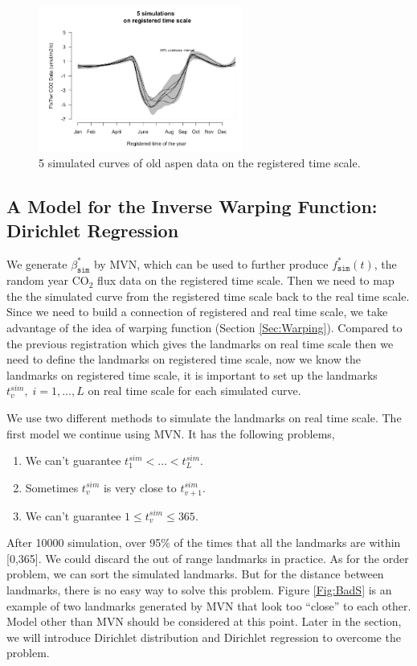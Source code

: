 \documentclass{article}\usepackage[]{graphicx}\usepackage[]{color}
\begin{document}
\begin{figure}[!ht]
\centering
\includegraphics[width=0.6\textwidth]{regiSimi1.png}
\caption{5 simulated curves of old aspen data on the registered time scale.}\label{Fig:regiSimi}
\end{figure}


\subsection{A Model for the Inverse Warping Function: Dirichlet Regression}\label{Sec:DiriReg}

We generate $\beta^*_{\texttt{sim}}$ by MVN, which can be used to further produce $f^*_{\texttt{sim}}(t)$, the random year CO$_2$ flux data on the registered time scale. Then we need to map the the simulated curve from the registered time scale back to the real time scale.  Since we need to build a connection of registered and real time scale, we take advantage of the idea of warping function (Section \ref{Sec:Warping}).  
Compared to the previous registration which gives the landmarks on real time scale then we need to define the landmarks on registered time scale, now we know the landmarks on registered time scale, it is important to set up the landmarks  $t_{v}^{sim},\;i=1,\dots,L$ on real time scale for each simulated curve. 
  
We use two different methods to simulate the landmarks on real time scale. 
 The first model we continue using MVN.  It has the following problems,

\begin{enumerate}
\item We can't guarantee $t_1^{sim}<\dots<t_L^{sim}$.
\item Sometimes $t_{v}^{sim}$ is very close to $t_{v+1}^{sim}$.
\item We can't guarantee $1\le t_{v}^{sim}\le 365$.
\end{enumerate}

After 10000 simulation, over 95\% of the times that all the landmarks are within [0,365].
We could discard the out of range landmarks in practice.
As for the order problem, we can sort the simulated landmarks. But for the distance between landmarks, there is no easy way to solve this problem. 
Figure \ref{Fig:BadS} is an example of two landmarks generated by MVN that look too ``close'' to each other. Model other than MVN should be considered at this point.  Later in the section, we will introduce Dirichlet distribution and Dirichlet regression to overcome the problem.
\end{document}
